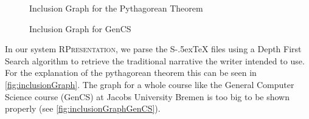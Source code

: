 \documentclass[twoside, 12pt]{article}
\def\stex{\texorpdfstring{\raisebox{-.5ex}S\kern-.5ex\TeX}{sTeX}\xspace}
\newcommand{\sys}{\textsc{RPresentation}\xspace}
\begin{document}
\begin{figure}
\vspace{-26pt}
  \begin{center}
\vspace{-16pt}
  \caption{Inclusion Graph for the Pythagorean Theorem}
  \label{fig:inclusionGraph}
\vspace{12pt}
  \end{center}
\end{figure}

\begin{figure}
\vspace{-80pt}
\end{figure}


\newpage

\begin{figure}
\vspace{-28pt}
  \begin{center}
\vspace{-16pt}
  \caption{Inclusion Graph for GenCS}
  \label{fig:inclusionGraphGenCS}
\vspace{-24pt}
  \end{center}
\end{figure}

In our system \sys, we parse the \stex files using a Depth First Search algorithm to retrieve the traditional narrative the writer intended to use. For the explanation of the pythagorean theorem this can be seen in \autoref{fig:inclusionGraph}. The graph for a whole course like the General Computer Science course (GenCS) at Jacobs University Bremen \cite{Kohlhase:GenCSII:base} is too big to be shown properly (see \autoref{fig:inclusionGraphGenCS}).\\
\end{document}
